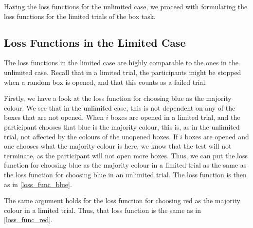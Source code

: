Having the loss functions for the unlimited case, we proceed with formulating the loss functions for the limited trials of the box task. 

\subsection{Loss Functions in the Limited Case}
The loss functions in the limited case are highly comparable to the ones in the unlimited case. Recall that in a limited trial, the participants might be stopped when a random box is opened, and that this counts as a failed trial. 

Firstly, we have a look at the loss function for choosing blue as the majority colour. We see that in the unlimited case, this is not dependent on any of the boxes that are not opened. When $i$ boxes are opened in a limited trial, and the participant chooses that blue is the majority colour, this is, as in the unlimited trial, not affected by the colours of the unopened boxes. If $i$ boxes are opened and one chooses what the majority colour is here, we know that the test will not terminate, as the participant will not open more boxes. Thus, we can put the loss function for choosing blue as the majority colour in a limited trial as the same as the loss function for choosing blue in an unlimited trial. The loss function is then as in \eqref{loss_func_blue}.

The same argument holds for the loss function for choosing red as the majority colour in a limited trial. Thus, that loss function is the same as in \eqref{loss_func_red}.

